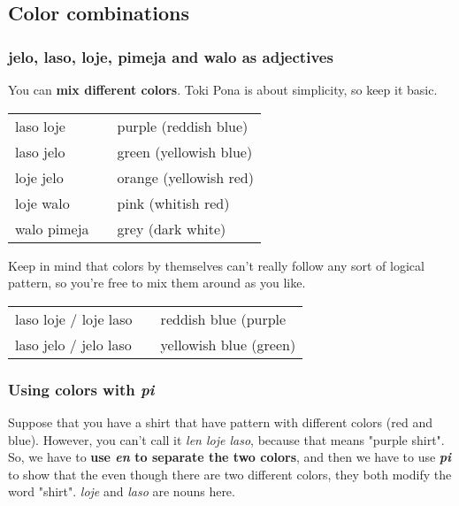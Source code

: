 \subsection*{Color combinations}
\subsubsection*{jelo, laso, loje, pimeja and walo as adjectives}

%
You can \textbf{mix different colors}. 
Toki Pona is about simplicity, so keep it basic. 

\begin{supertabular}{p{5,5cm}|ll}
laso loje && purple (reddish blue) \\
laso jelo && green (yellowish blue) \\
loje jelo && orange (yellowish red) \\
loje walo && pink (whitish red) \\
walo pimeja && grey (dark white) \\
\end{supertabular} 

Keep in mind that colors by themselves can't really follow any sort of logical pattern, so you're free to mix them around as you like. 

\begin{supertabular}{p{5,5cm}|ll}
laso loje / loje laso && reddish blue (purple \\
laso jelo / jelo laso && yellowish blue (green) \\
\end{supertabular} 
%
%
\subsubsection*{Using colors with \textit{pi}}
%
Suppose that you have a shirt that have pattern with different colors (red and blue). 
However, you can't call it \textit{len loje laso}, because that means "purple shirt". 
So, we have to \textbf{use \textit{en} to separate the two colors}, and then we have to use \textbf{\textit{pi}} to show that the even though there are two different colors, they both modify the word "shirt".
\textit{loje} and \textit{laso} are nouns here. 

